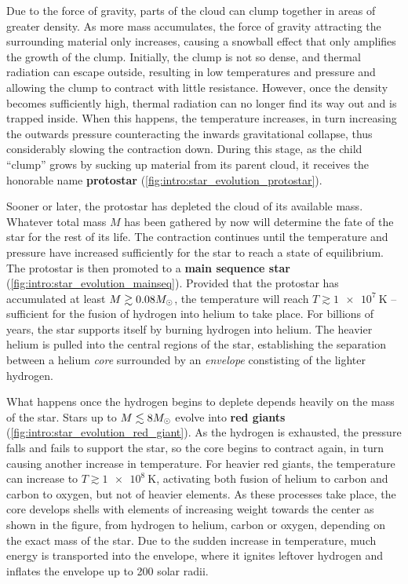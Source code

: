 Due to the force of gravity, parts of the cloud can clump together in areas of greater density.
As more mass accumulates, the force of gravity attracting the surrounding material only increases, causing a snowball effect that only amplifies the growth of the clump.
Initially, the clump is not so dense, and thermal radiation can escape outside, resulting in low temperatures and pressure and allowing the clump to contract with little resistance.
However, once the density becomes sufficiently high, thermal radiation can no longer find its way out and is trapped inside.
When this happens, the temperature increases, in turn increasing the outwards pressure counteracting the inwards gravitational collapse, thus considerably slowing the contraction down.
During this stage, as the child ``clump'' grows by sucking up material from its parent cloud, it receives the honorable name \textbf{protostar} (\cref{fig:intro:star_evolution_protostar}).

Sooner or later, the protostar has depleted the cloud of its available mass.
Whatever total mass $M$ has been gathered by now will determine the fate of the star for the rest of its life.
The contraction continues until the temperature and pressure have increased sufficiently for the star to reach a state of equilibrium.
The protostar is then promoted to a \textbf{main sequence star} (\cref{fig:intro:star_evolution_mainseq}).
Provided that the protostar has accumulated at least $M \gtrsim 0.08 M_\odot$, the temperature will reach $T \gtrsim \SI{1e7}{\kelvin}$ -- sufficient for the fusion of hydrogen into helium to take place.
For billions of years, the star supports itself by burning hydrogen into helium.
The heavier helium is pulled into the central regions of the star, establishing the separation between a helium \emph{core} surrounded by an \emph{envelope} constisting of the lighter hydrogen.

What happens once the hydrogen begins to deplete depends heavily on the mass of the star.
Stars up to $M \lesssim 8 M_\odot$ evolve into \textbf{red giants} (\cref{fig:intro:star_evolution_red_giant}).
As the hydrogen is exhausted, the pressure falls and fails to support the star, so the core begins to contract again, in turn causing another increase in temperature.
For heavier red giants, the temperature can increase to $T \gtrsim \SI{1e8}{\kelvin}$, activating both fusion of helium to carbon and carbon to oxygen, but not of heavier elements.
As these processes take place, the core develops shells with elements of increasing weight towards the center as shown in the figure, from hydrogen to helium, carbon or oxygen, depending on the exact mass of the star.
Due to the sudden increase in temperature, much energy is transported into the envelope, where it ignites leftover hydrogen and inflates the envelope up to 200 solar radii.

